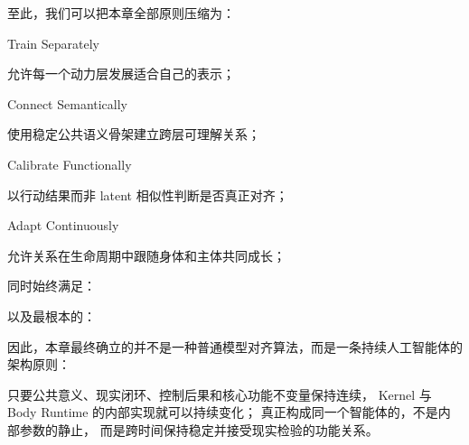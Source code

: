 至此，我们可以把本章全部原则压缩为：

\begin{proposition*}
Train Separately
\end{proposition*}

允许每一个动力层发展适合自己的表示；

\begin{statementbox}
Connect Semantically
\end{statementbox}

使用稳定公共语义骨架建立跨层可理解关系；

\begin{statementbox}
Calibrate Functionally
\end{statementbox}

以行动结果而非 latent 相似性判断是否真正对齐；

\begin{proposition*}
Adapt Continuously
\end{proposition*}

允许关系在生命周期中跟随身体和主体共同成长；

同时始终满足：

\begin{statementbox}
\centering
{}
\end{statementbox}

以及最根本的：

\begin{statementbox}
\centering
{}
\end{statementbox}

因此，本章最终确立的并不是一种普通模型对齐算法，而是一条持续人工智能体的架构原则：

\begin{proposition*}
只要公共意义、现实闭环、控制后果和核心功能不变量保持连续，
Kernel 与 Body Runtime 的内部实现就可以持续变化；
真正构成同一个智能体的，不是内部参数的静止，
而是跨时间保持稳定并接受现实检验的功能关系。
\end{proposition*}
